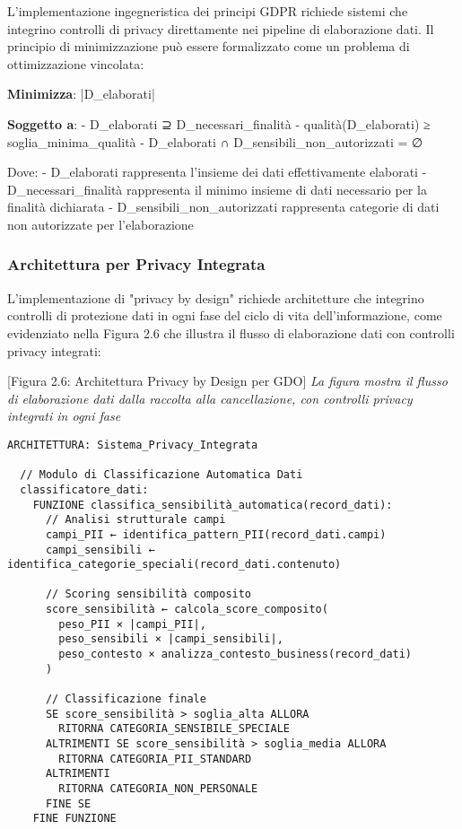 {L'implementazione ingegneristica dei principi GDPR richiede sistemi che integrino controlli di privacy direttamente nei pipeline di elaborazione dati. Il principio di minimizzazione può essere formalizzato come un problema di ottimizzazione vincolata:

\textbf{Minimizza}: |D_elaborati|

\textbf{Soggetto a}:
- D_elaborati ⊇ D_necessari_finalità
- qualità(D_elaborati) ≥ soglia_minima_qualità
- D_elaborati ∩ D_sensibili_non_autorizzati = ∅

Dove:
- D_elaborati rappresenta l'insieme dei dati effettivamente elaborati
- D_necessari_finalità rappresenta il minimo insieme di dati necessario per la finalità dichiarata
- D_sensibili_non_autorizzati rappresenta categorie di dati non autorizzate per l'elaborazione

\subsubsection{Architettura per Privacy Integrata}

L'implementazione di "privacy by design" richiede architetture che integrino controlli di protezione dati in ogni fase del ciclo di vita dell'informazione, come evidenziato nella Figura 2.6 che illustra il flusso di elaborazione dati con controlli privacy integrati:

[Figura 2.6: Architettura Privacy by Design per GDO]
\textit{La figura mostra il flusso di elaborazione dati dalla raccolta alla cancellazione, con controlli privacy integrati in ogni fase}

\begin{verbatim}
ARCHITETTURA: Sistema_Privacy_Integrata

  // Modulo di Classificazione Automatica Dati
  classificatore_dati:
    FUNZIONE classifica_sensibilità_automatica(record_dati):
      // Analisi strutturale campi
      campi_PII ← identifica_pattern_PII(record_dati.campi)
      campi_sensibili ← identifica_categorie_speciali(record_dati.contenuto)
      
      // Scoring sensibilità composito
      score_sensibilità ← calcola_score_composito(
        peso_PII × |campi_PII|,
        peso_sensibili × |campi_sensibili|,
        peso_contesto × analizza_contesto_business(record_dati)
      )
      
      // Classificazione finale
      SE score_sensibilità > soglia_alta ALLORA
        RITORNA CATEGORIA_SENSIBILE_SPECIALE
      ALTRIMENTI SE score_sensibilità > soglia_media ALLORA  
        RITORNA CATEGORIA_PII_STANDARD
      ALTRIMENTI
        RITORNA CATEGORIA_NON_PERSONALE
      FINE SE
    FINE FUNZIONE


\end{verbatim}}
